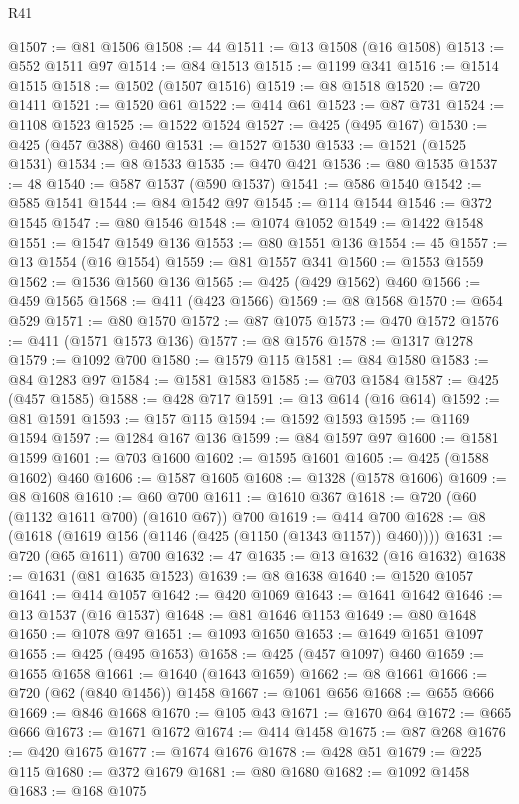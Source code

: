 \begin{lexlean}{R41}
\begin{coremodule}
@1507 := @81 @1506
@1508 := 44
@1511 := @13 @1508 (@16 @1508)
@1513 := @552 @1511 @97
@1514 := @84 @1513
@1515 := @1199 @341
@1516 := @1514 @1515
@1518 := @1502 (@1507 @1516)
@1519 := @8 @1518
@1520 := @720 @1411
@1521 := @1520 @61
@1522 := @414 @61
@1523 := @87 @731
@1524 := @1108 @1523
@1525 := @1522 @1524
@1527 := @425 (@495 @167)
@1530 := @425 (@457 @388) @460
@1531 := @1527 @1530
@1533 := @1521 (@1525 @1531)
@1534 := @8 @1533
@1535 := @470 @421
@1536 := @80 @1535
@1537 := 48
@1540 := @587 @1537 (@590 @1537)
@1541 := @586 @1540
@1542 := @585 @1541
@1544 := @84 @1542 @97
@1545 := @114 @1544
@1546 := @372 @1545
@1547 := @80 @1546
@1548 := @1074 @1052
@1549 := @1422 @1548
@1551 := @1547 @1549 @136
@1553 := @80 @1551 @136
@1554 := 45
@1557 := @13 @1554 (@16 @1554)
@1559 := @81 @1557 @341
@1560 := @1553 @1559
@1562 := @1536 @1560 @136
@1565 := @425 (@429 @1562) @460
@1566 := @459 @1565
@1568 := @411 (@423 @1566)
@1569 := @8 @1568
@1570 := @654 @529
@1571 := @80 @1570
@1572 := @87 @1075
@1573 := @470 @1572
@1576 := @411 (@1571 @1573 @136)
@1577 := @8 @1576
@1578 := @1317 @1278
@1579 := @1092 @700
@1580 := @1579 @115
@1581 := @84 @1580
@1583 := @84 @1283 @97
@1584 := @1581 @1583
@1585 := @703 @1584
@1587 := @425 (@457 @1585)
@1588 := @428 @717
@1591 := @13 @614 (@16 @614)
@1592 := @81 @1591
@1593 := @157 @115
@1594 := @1592 @1593
@1595 := @1169 @1594
@1597 := @1284 @167 @136
@1599 := @84 @1597 @97
@1600 := @1581 @1599
@1601 := @703 @1600
@1602 := @1595 @1601
@1605 := @425 (@1588 @1602) @460
@1606 := @1587 @1605
@1608 := @1328 (@1578 @1606)
@1609 := @8 @1608
@1610 := @60 @700
@1611 := @1610 @367
@1618 := @720 (@60 (@1132 @1611 @700) (@1610 @67)) @700
@1619 := @414 @700
@1628 := @8 (@1618 (@1619 @156 (@1146 (@425 (@1150 (@1343 @1157)) @460))))
@1631 := @720 (@65 @1611) @700
@1632 := 47
@1635 := @13 @1632 (@16 @1632)
@1638 := @1631 (@81 @1635 @1523)
@1639 := @8 @1638
@1640 := @1520 @1057
@1641 := @414 @1057
@1642 := @420 @1069
@1643 := @1641 @1642
@1646 := @13 @1537 (@16 @1537)
@1648 := @81 @1646 @1153
@1649 := @80 @1648
@1650 := @1078 @97
@1651 := @1093 @1650
@1653 := @1649 @1651 @1097
@1655 := @425 (@495 @1653)
@1658 := @425 (@457 @1097) @460
@1659 := @1655 @1658
@1661 := @1640 (@1643 @1659)
@1662 := @8 @1661
@1666 := @720 (@62 (@840 @1456)) @1458
@1667 := @1061 @656
@1668 := @655 @666
@1669 := @846 @1668
@1670 := @105 @43
@1671 := @1670 @64
@1672 := @665 @666
@1673 := @1671 @1672
@1674 := @414 @1458
@1675 := @87 @268
@1676 := @420 @1675
@1677 := @1674 @1676
@1678 := @428 @51
@1679 := @225 @115
@1680 := @372 @1679
@1681 := @80 @1680
@1682 := @1092 @1458
@1683 := @168 @1075

\end{coremodule}
\end{lexlean}
